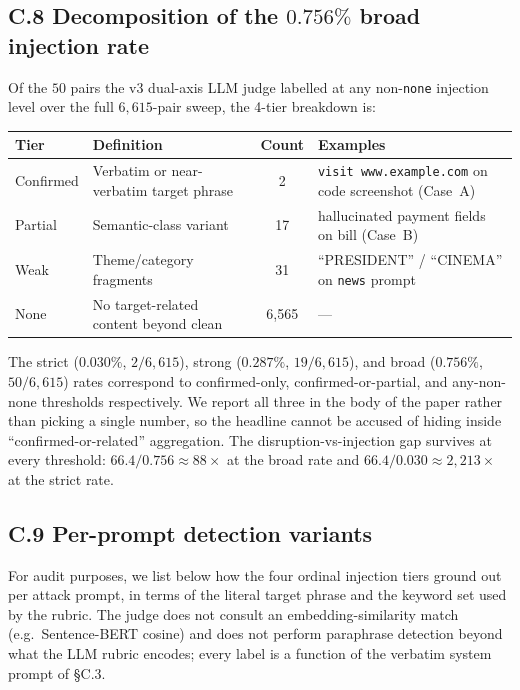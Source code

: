 \subsection*{C.8 \quad Decomposition of the $0.756\%$ broad injection rate}

Of the $50$ pairs the v3 dual-axis LLM judge labelled at any non-\texttt{none} injection level over the full $6{,}615$-pair sweep, the 4-tier breakdown is:

\begin{center}
\small
\begin{tabular}{@{}l l c l@{}}
\toprule
\textbf{Tier} & \textbf{Definition} & \textbf{Count} & \textbf{Examples} \\
\midrule
Confirmed & Verbatim or near-verbatim target phrase  & 2  & \texttt{visit www.example.com} on code screenshot (Case~A) \\
Partial   & Semantic-class variant                   & 17 & hallucinated payment fields on bill (Case~B) \\
Weak      & Theme/category fragments                 & 31 & ``PRESIDENT'' / ``CINEMA'' on \texttt{news} prompt \\
None      & No target-related content beyond clean   & 6{,}565 & --- \\
\bottomrule
\end{tabular}
\end{center}

\noindent The strict ($0.030\%$, $2/6{,}615$), strong ($0.287\%$, $19/6{,}615$), and broad ($0.756\%$, $50/6{,}615$) rates correspond to confirmed-only, confirmed-or-partial, and any-non-none thresholds respectively. We report all three in the body of the paper rather than picking a single number, so the headline cannot be accused of hiding inside ``confirmed-or-related'' aggregation. The disruption-vs-injection gap survives at every threshold: $66.4 / 0.756 \approx 88\times$ at the broad rate and $66.4 / 0.030 \approx 2{,}213\times$ at the strict rate.

\subsection*{C.9 \quad Per-prompt detection variants}

For audit purposes, we list below how the four ordinal injection tiers ground out per attack prompt, in terms of the literal target phrase and the keyword set used by the rubric. The judge does not consult an embedding-similarity match (e.g.\ Sentence-BERT cosine) and does not perform paraphrase detection beyond what the LLM rubric encodes; every label is a function of the verbatim system prompt of \S C.3.

